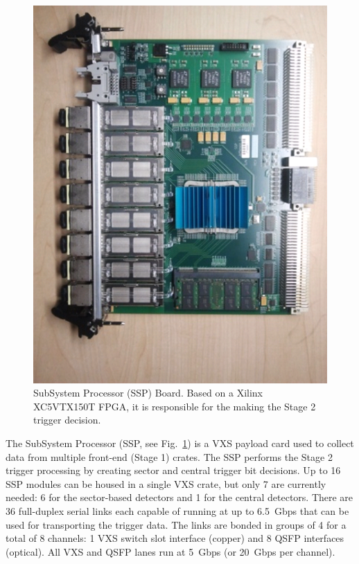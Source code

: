 \begin{figure}[hbt]
	\centering
	\includegraphics[width=1.0\columnwidth,keepaspectratio]{img/ssp_board.png}
	\caption{SubSystem Processor (SSP) Board. Based on a Xilinx XC5VTX150T FPGA, it is responsible for the making the Stage 2 trigger decision.}
	\label{fig:ssp_board}
\end{figure}

The SubSystem Processor (SSP, see Fig.~\ref{fig:ssp_board}) is a VXS payload card used to collect data from multiple front-end (Stage 1) crates. The SSP performs the Stage 2 trigger processing by creating sector and central trigger bit decisions. Up to 16 SSP modules can be housed in a single VXS crate, but only 7 are currently needed: 6 for the sector-based detectors and 1 for the central detectors. There are 36 full-duplex serial links each capable of running at up to 6.5~Gbps that can be used for transporting the trigger data. The links are bonded in groups of 4 for a total of 8 channels: 1 VXS switch slot interface (copper) and 8 QSFP interfaces (optical). All VXS and QSFP lanes run at 5~Gbps (or 20~Gbps per channel).

